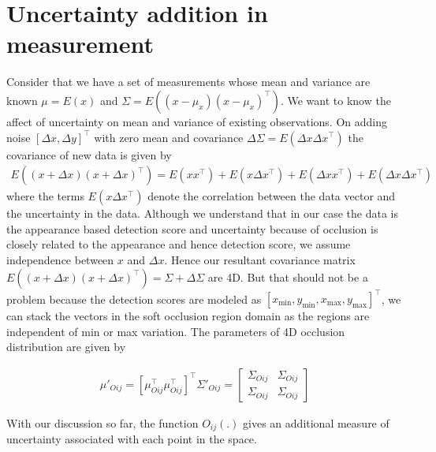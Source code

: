   \section{Uncertainty addition in measurement}
  Consider that we have a set of measurements whose mean and variance are known $\mu = E(x)$ and $\Sigma = E ((x - \mu_x)(x - \mu_x)^\top)$. We want to know the
  affect of uncertainty on mean and variance of existing observations. On adding
  noise $[\Delta x, \Delta y]^\top$ with zero mean and covariance $\Delta
  \Sigma = E(\Delta x \Delta x^\top)$ the covariance of new data is given by
  \begin{align}
    E((x + \Delta x)(x+\Delta x)^\top) = E(xx^\top) + E(x \Delta x^\top) %
    + E(\Delta x x^\top) + E(\Delta x \Delta x^\top)
  \end{align}
  where the terms $E(x \Delta x^\top)$ denote the correlation between the data
  vector and the uncertainty in the data. Although we understand that in our case
  the data is the appearance based detection score and uncertainty because of
  occlusion is closely related to the appearance and hence detection score, we
  assume independence between $x$ and $\Delta x$. Hence our resultant covariance
  matrix $ E((x + \Delta x)(x+\Delta x)^\top) = \Sigma + \Delta \Sigma$
  are 4D. But that should not be a problem because the detection scores are
  modeled as $[x_{\text{min}}, y_{\text{min}}, x_{\text{max}},
  y_{\text{max}}]^\top$, we can stack the vectors in the soft occlusion region
  domain as the regions are independent of min or max variation. The parameters
  of 4D occlusion distribution are given by

  \begin{align}
    \mu'_{Oij} = [\mu_{Oij}^\top \mu_{Oij}^\top]^\top
    \Sigma'_{Oij} = \begin{bmatrix}
      \Sigma_{Oij} & \Sigma_{Oij} \\
  \Sigma_{Oij} & \Sigma_{Oij}
    \end{bmatrix}
  \end{align}

  With our
  discussion so far, the function $O_{ij}(.)$ gives an additional measure of
  uncertainty associated with each point in the space.


